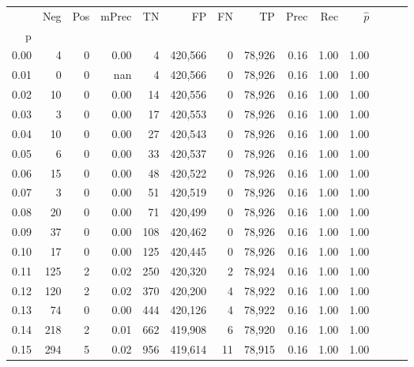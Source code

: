 \begin{tabular}{rrrrrrrrrrrrrr}
\toprule
{} &     Neg &    Pos & mPrec &       TN &       FP &      FN &      TP &  Prec &   Rec & $\hat{p}$ \\
p    &         &        &       &          &          &         &         &       &       &           \\
\midrule
0.00 &       4 &      0 &  0.00 &        4 &  420,566 &       0 &  78,926 &  0.16 &  1.00 &      1.00 \\
0.01 &       0 &      0 &   nan &        4 &  420,566 &       0 &  78,926 &  0.16 &  1.00 &      1.00 \\
0.02 &      10 &      0 &  0.00 &       14 &  420,556 &       0 &  78,926 &  0.16 &  1.00 &      1.00 \\
0.03 &       3 &      0 &  0.00 &       17 &  420,553 &       0 &  78,926 &  0.16 &  1.00 &      1.00 \\
0.04 &      10 &      0 &  0.00 &       27 &  420,543 &       0 &  78,926 &  0.16 &  1.00 &      1.00 \\
0.05 &       6 &      0 &  0.00 &       33 &  420,537 &       0 &  78,926 &  0.16 &  1.00 &      1.00 \\
0.06 &      15 &      0 &  0.00 &       48 &  420,522 &       0 &  78,926 &  0.16 &  1.00 &      1.00 \\
0.07 &       3 &      0 &  0.00 &       51 &  420,519 &       0 &  78,926 &  0.16 &  1.00 &      1.00 \\
0.08 &      20 &      0 &  0.00 &       71 &  420,499 &       0 &  78,926 &  0.16 &  1.00 &      1.00 \\
0.09 &      37 &      0 &  0.00 &      108 &  420,462 &       0 &  78,926 &  0.16 &  1.00 &      1.00 \\
0.10 &      17 &      0 &  0.00 &      125 &  420,445 &       0 &  78,926 &  0.16 &  1.00 &      1.00 \\
0.11 &     125 &      2 &  0.02 &      250 &  420,320 &       2 &  78,924 &  0.16 &  1.00 &      1.00 \\
0.12 &     120 &      2 &  0.02 &      370 &  420,200 &       4 &  78,922 &  0.16 &  1.00 &      1.00 \\
0.13 &      74 &      0 &  0.00 &      444 &  420,126 &       4 &  78,922 &  0.16 &  1.00 &      1.00 \\
0.14 &     218 &      2 &  0.01 &      662 &  419,908 &       6 &  78,920 &  0.16 &  1.00 &      1.00 \\
0.15 &     294 &      5 &  0.02 &      956 &  419,614 &      11 &  78,915 &  0.16 &  1.00 &      1.00 \\

\end{tabular}
